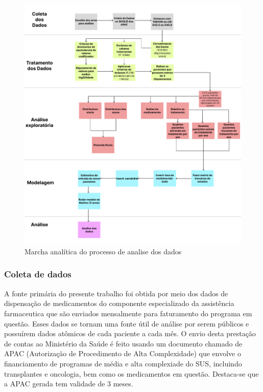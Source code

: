 \documentclass[article,a4paper,12pt,brazil,sumario=tradicional]{abntex2}
\begin{document}
\begin{figure}[!ht]
    \centering
    \includegraphics[width=1\textwidth]{marcha_analitica.png}
    \caption{Marcha analítica do processo de analise dos dados}
    \label{fig:marcha_analitica}
\end{figure}

\subsubsection{Coleta de dados}

A fonte primária do presente trabalho foi obtida por meio dos dados de dispensação de medicamentos do componente especializado da assistência farmaceutica que são enviados mensalmente para faturamento do programa em questão. Esses dados se tornam uma fonte útil de análise por serem públicos e possuírem dados atômicos de cada paciente a cada mês. O envio desta prestação de contas ao Ministério da Saúde é feito usando um documento chamado de APAC (Autorização de Procedimento de Alta Complexidade) que envolve o financiamento de programas de média e alta complexiade do SUS, incluindo transplantes e oncologia, bem como os medicamentos em questão. Destaca-se que a APAC gerada tem validade de 3 meses.
\end{document}
